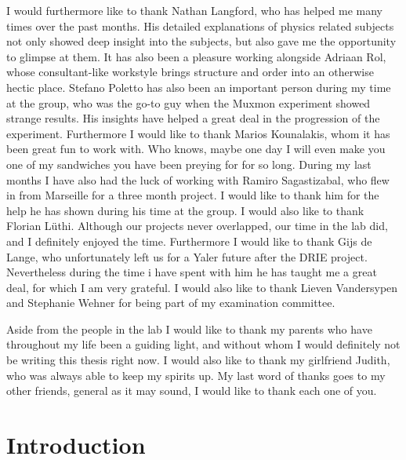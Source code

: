 \documentclass[12pt]{report}
\newcommand\blankpage{%
    \null
    \thispagestyle{empty}%
    \addtocounter{page}{-1}%
    \newpage}
\begin{document}
I would furthermore like to thank Nathan Langford, who has helped me many times over the past months. His detailed explanations of physics related subjects not only showed deep insight into the subjects, but also gave me the opportunity to glimpse at them. It has also been a pleasure working alongside Adriaan Rol, whose consultant-like workstyle brings structure and order into an otherwise hectic place. Stefano Poletto has also been an important person during my time at the group, who was the go-to guy when the Muxmon experiment showed strange results. His insights have helped a great deal in the progression of the experiment. Furthermore I would like to thank Marios Kounalakis, whom it has been great fun to work with. Who knows, maybe one day I will even make you one of my sandwiches you have been preying for for so long. During my last months I have also had the luck of working with Ramiro Sagastizabal, who flew in from Marseille for a three month project. I would like to thank him for the help he has shown during his time at the group. I would also like to thank Florian L\"uthi. Although our projects never overlapped, our time in the lab did, and I definitely enjoyed the time. Furthermore I would like to thank Gijs de Lange, who unfortunately left us for a Yaler future after the DRIE project. Nevertheless during the time i have spent with him he has taught me a great deal, for which I am very grateful. I would also like to thank Lieven Vandersypen and Stephanie Wehner for being part of my examination committee.

Aside from the people in the lab I would like to thank my parents who have throughout my life been a guiding light, and without whom I would definitely not be writing this thesis right now. I would also like to thank my girlfriend Judith, who was always able to keep my spirits up. My last word of thanks goes to my other friends, general as it may sound, I would like to thank each one of you.


\blankpage
\tableofcontents
\newpage

\sectionfont{\scshape}



\chapter{Introduction}
\end{document}
